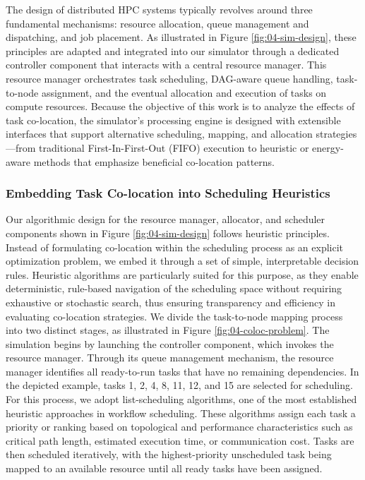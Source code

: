 The design of distributed HPC systems typically revolves around three fundamental mechanisms: resource allocation, queue management and dispatching, and job placement. As illustrated in Figure \ref{fig:04-sim-design}, these principles are adapted and integrated into our simulator through a dedicated controller component that interacts with a central resource manager. This resource manager orchestrates task scheduling, DAG-aware queue handling, task-to-node assignment, and the eventual allocation and execution of tasks on compute resources. Because the objective of this work is to analyze the effects of task co-location, the simulator's processing engine is designed with extensible interfaces that support alternative scheduling, mapping, and allocation strategies—from traditional First-In-First-Out (FIFO) execution to heuristic or energy-aware methods that emphasize beneficial co-location patterns.

\subsubsection{Embedding Task Co-location into Scheduling Heuristics}
\label{sec:heuristic_design}

Our algorithmic design for the resource manager, allocator, and scheduler components shown in Figure \ref{fig:04-sim-design} follows heuristic principles. Instead of formulating co-location within the scheduling process as an explicit optimization problem, we embed it through a set of simple, interpretable decision rules. Heuristic algorithms are particularly suited for this purpose, as they enable deterministic, rule-based navigation of the scheduling space without requiring exhaustive or stochastic search, thus ensuring transparency and efficiency in evaluating co-location strategies. We divide the task-to-node mapping process into two distinct stages, as illustrated in Figure \ref{fig:04-coloc-problem}. The simulation begins by launching the controller component, which invokes the resource manager. Through its queue management mechanism, the resource manager identifies all ready-to-run tasks that have no remaining dependencies. In the depicted example, tasks 1, 2, 4, 8, 11, 12, and 15 are selected for scheduling. For this process, we adopt list-scheduling algorithms, one of the most established heuristic approaches in workflow scheduling. These algorithms assign each task a priority or ranking based on topological and performance characteristics such as critical path length, estimated execution time, or communication cost. Tasks are then scheduled iteratively, with the highest-priority unscheduled task being mapped to an available resource until all ready tasks have been assigned.

